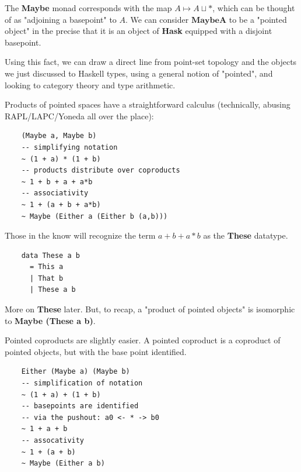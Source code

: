 \documentclass[tikz]{beamer}
\theoremstyle{definition}
\begin{document}
\frame
{
	The \textbf{Maybe} monad corresponds with the map $A \mapsto  A \sqcup *$, which can be thought of as "adjoining a basepoint" to $A$. We can consider $\mathbf{Maybe A}$ to be a "pointed object" in the precise that it is an object of \textbf{Hask} equipped with a disjoint basepoint. 
}

\frame
{
 	Using this fact, we can draw a direct line from point-set topology and the objects we just discussed to Haskell types, using a general notion of "pointed", and looking to category theory and type arithmetic. 
}

\begin{frame}[fragile]
	Products of pointed spaces have a straightforward calculus (technically, abusing RAPL/LAPC/Yoneda all over the place):  
	
	\begin{verbatim}
	(Maybe a, Maybe b)
	-- simplifying notation
	~ (1 + a) * (1 + b)
	-- products distribute over coproducts
	~ 1 + b + a + a*b
	-- associativity
	~ 1 + (a + b + a*b)
	~ Maybe (Either a (Either b (a,b)))
	\end{verbatim}
\end{frame}

\frame
{
	Those in the know will recognize the term $a + b + a*b$ as the \textbf{These} datatype.
}

\begin{frame}[fragile]
\begin{center}
	\begin{verbatim}
	data These a b 
	  = This a
	  | That b
	  | These a b
	\end{verbatim}
\end{center}
\end{frame}

\frame
{
	More on \textbf{These} later. But, to recap, a "product of pointed objects" is isomorphic to \textbf{Maybe (These a b)}.
}

\frame
{
	Pointed coproducts are slightly easier. A pointed coproduct is a coproduct of pointed objects, but with the base point identified.
}

\begin{frame}[fragile]
\begin{center}
	\begin{verbatim}
	Either (Maybe a) (Maybe b)
	-- simplification of notation
	~ (1 + a) + (1 + b)
	-- basepoints are identified 
	-- via the pushout: a0 <- * -> b0
	~ 1 + a + b
	-- assocativity
	~ 1 + (a + b)
	~ Maybe (Either a b)
	\end{verbatim}
\end{center}
\end{frame}
\end{document}
